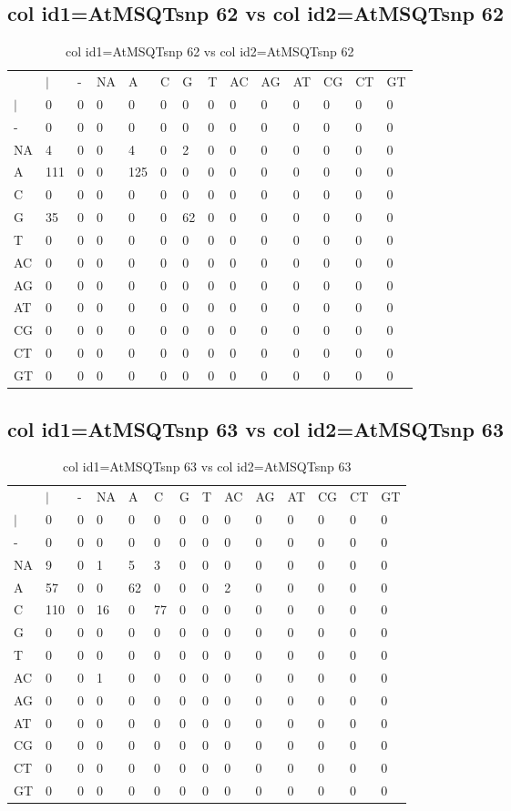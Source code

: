 \subsection{col id1=AtMSQTsnp 62 vs col id2=AtMSQTsnp 62}
\begin{center}
\begin{longtable}{|l|l|l|l|l|l|l|l|l|l|l|l|l|l|}
\caption{col id1=AtMSQTsnp 62 vs col id2=AtMSQTsnp 62} \label{table_dm954}\\
\hline
\\
\hline
&$|$&-&NA&A&C&G&T&AC&AG&AT&CG&CT&GT\\
$|$&0&0&0&0&0&0&0&0&0&0&0&0&0\\
-&0&0&0&0&0&0&0&0&0&0&0&0&0\\
NA&4&0&0&4&0&2&0&0&0&0&0&0&0\\
A&111&0&0&125&0&0&0&0&0&0&0&0&0\\
C&0&0&0&0&0&0&0&0&0&0&0&0&0\\
G&35&0&0&0&0&62&0&0&0&0&0&0&0\\
T&0&0&0&0&0&0&0&0&0&0&0&0&0\\
AC&0&0&0&0&0&0&0&0&0&0&0&0&0\\
AG&0&0&0&0&0&0&0&0&0&0&0&0&0\\
AT&0&0&0&0&0&0&0&0&0&0&0&0&0\\
CG&0&0&0&0&0&0&0&0&0&0&0&0&0\\
CT&0&0&0&0&0&0&0&0&0&0&0&0&0\\
GT&0&0&0&0&0&0&0&0&0&0&0&0&0\\
\hline
\end{longtable}
\end{center}

\subsection{col id1=AtMSQTsnp 63 vs col id2=AtMSQTsnp 63}
\begin{center}
\begin{longtable}{|l|l|l|l|l|l|l|l|l|l|l|l|l|l|}
\caption{col id1=AtMSQTsnp 63 vs col id2=AtMSQTsnp 63} \label{table_dm956}\\
\hline
\\
\hline
&$|$&-&NA&A&C&G&T&AC&AG&AT&CG&CT&GT\\
$|$&0&0&0&0&0&0&0&0&0&0&0&0&0\\
-&0&0&0&0&0&0&0&0&0&0&0&0&0\\
NA&9&0&1&5&3&0&0&0&0&0&0&0&0\\
A&57&0&0&62&0&0&0&2&0&0&0&0&0\\
C&110&0&16&0&77&0&0&0&0&0&0&0&0\\
G&0&0&0&0&0&0&0&0&0&0&0&0&0\\
T&0&0&0&0&0&0&0&0&0&0&0&0&0\\
AC&0&0&1&0&0&0&0&0&0&0&0&0&0\\
AG&0&0&0&0&0&0&0&0&0&0&0&0&0\\
AT&0&0&0&0&0&0&0&0&0&0&0&0&0\\
CG&0&0&0&0&0&0&0&0&0&0&0&0&0\\
CT&0&0&0&0&0&0&0&0&0&0&0&0&0\\
GT&0&0&0&0&0&0&0&0&0&0&0&0&0\\
\hline
\end{longtable}
\end{center}

